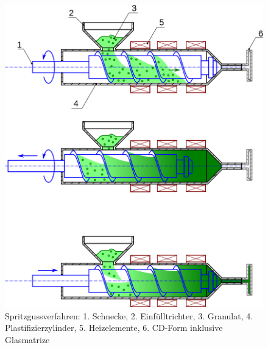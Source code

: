 \begin{figure}[h]
  \begin{center}
      \begin{minipage}[t]{\textwidth}
        \begin{center}
            \includegraphics[height=0.5\textheight]{Bilder/Optische_Datentraeger_Die_Compact_Disc/Herstellung/cdspritz.png}
            \caption[Spritzgussverfahren \newline \url{https://upload.wikimedia.org/wikipedia/commons/thumb/2/23/Principe_moulage_injection_polymere.svg/899px-Principe_moulage_injection_polymere.svg.png} (zuletzt aufgerufen am 11.08.2015)]{Spritzgussverfahren: 1. Schnecke, 2. Einfülltrichter, 3. Granulat, 4. Plastifizierzylinder, 5. Heizelemente, 6. CD-Form inklusive Glasmatrize}
            \label{fig:cdspritz}
        \end{center}
      \end{minipage}
  \end{center}
\end{figure}
